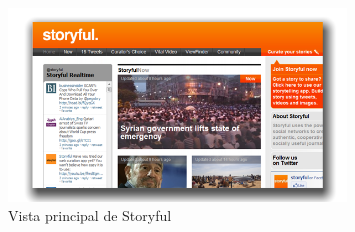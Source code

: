 \begin{figure}[H]
	\centering
	\includegraphics[width=0.8\textwidth]{imgs/storyful.png}
	\caption{Vista principal de Storyful}
	\label{fig:storyful}
\end{figure}



